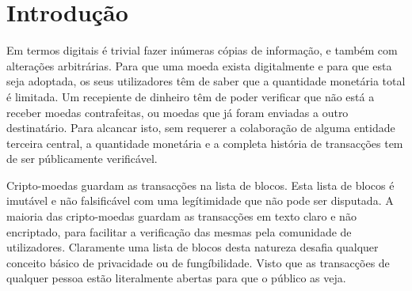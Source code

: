 \chapter{Introdução}
\label{chapter:introduction}

Em termos digitais é trivial fazer inúmeras cópias de informação, e também com alterações arbitrárias. Para que uma moeda exista digitalmente e para que esta seja adoptada, os seus utilizadores têm de saber que a quantidade monetária total é limitada. Um recepiente de dinheiro têm de poder verificar que não está a receber moedas contrafeitas, ou moedas que já foram enviadas a outro destinatário. Para alcancar isto, sem requerer a colaboração de alguma entidade terceira central, a quantidade monetária e a completa história de transacções tem de ser públicamente verificável. 
    



\newline
Cripto-moedas guardam as transacções na lista de blocos. Esta lista de blocos é imutável e não falsificável com uma legítimidade que não pode ser disputada. A maioria das cripto-moedas guardam as transacções em texto claro e não encriptado, para facilitar a verificação das mesmas pela comunidade de utilizadores. Claramente uma lista de blocos desta natureza desafia qualquer conceito básico de privacidade ou de fungíbilidade. Visto que as transacções de qualquer pessoa estão literalmente abertas para que o público as veja.
 
